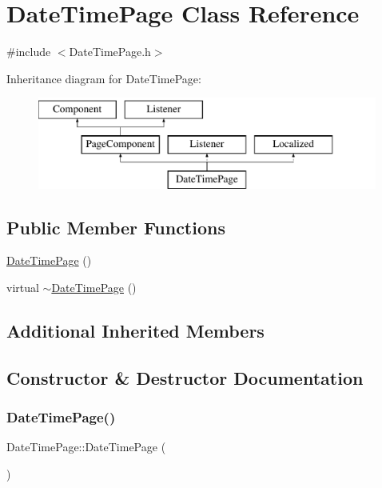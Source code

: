 \hypertarget{classDateTimePage}{}\section{Date\+Time\+Page Class Reference}
\label{classDateTimePage}


{\ttfamily \#include $<$Date\+Time\+Page.\+h$>$}

Inheritance diagram for Date\+Time\+Page\+:\begin{figure}[H]
\begin{center}
\leavevmode
\includegraphics[height=3.000000cm]{classDateTimePage}
\end{center}
\end{figure}
\subsection*{Public Member Functions}
\begin{DoxyCompactItemize}
\item 
\mbox{\hyperlink{classDateTimePage_a3fb514ad9a6a23f9484b548c788275eb}{Date\+Time\+Page}} ()
\item 
virtual \mbox{\hyperlink{classDateTimePage_a1202f0b3be630059c449f09dc488e5b5}{$\sim$\+Date\+Time\+Page}} ()
\end{DoxyCompactItemize}
\subsection*{Additional Inherited Members}


\subsection{Constructor \& Destructor Documentation}
\mbox{\label{classDateTimePage_a3fb514ad9a6a23f9484b548c788275eb}} 
\subsubsection{\texorpdfstring{Date\+Time\+Page()}{DateTimePage()}}
{\footnotesize\ttfamily Date\+Time\+Page\+::\+Date\+Time\+Page (\begin{DoxyParamCaption}{ }\end{DoxyParamCaption})}

